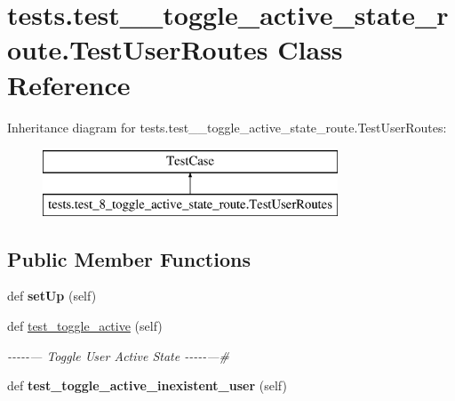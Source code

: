 \hypertarget{classtests_1_1test__8__toggle__active__state__route_1_1_test_user_routes}{}\section{tests.\+test\+\_\+\_\+toggle\+\_\+active\+\_\+state\+\_\+route.\+Test\+User\+Routes Class Reference}
\label{classtests_1_1test__8__toggle__active__state__route_1_1_test_user_routes}
Inheritance diagram for tests.\+test\+\_\+\_\+toggle\+\_\+active\+\_\+state\+\_\+route.\+Test\+User\+Routes\+:\begin{figure}[H]
\begin{center}
\leavevmode
\includegraphics[height=2.000000cm]{classtests_1_1test__8__toggle__active__state__route_1_1_test_user_routes}
\end{center}
\end{figure}
\subsection*{Public Member Functions}
\begin{DoxyCompactItemize}
\item 
\mbox{\label{classtests_1_1test__8__toggle__active__state__route_1_1_test_user_routes_ace5e2927f43fc2c7e516df32d2d1d393}} 
def {\bfseries set\+Up} (self)
\item 
\mbox{\label{classtests_1_1test__8__toggle__active__state__route_1_1_test_user_routes_afdcfbebc23000d71f55895db555adb29}} 
def \hyperlink{classtests_1_1test__8__toggle__active__state__route_1_1_test_user_routes_afdcfbebc23000d71f55895db555adb29}{test\+\_\+toggle\+\_\+active} (self)
\begin{DoxyCompactList}\small\item\em -\/-\/-\/-\/-\/--- Toggle User Active State -\/-\/-\/-\/-\/---\# \end{DoxyCompactList}\item 
\mbox{\label{classtests_1_1test__8__toggle__active__state__route_1_1_test_user_routes_a7d0dd3e2a68d3485e9bd593c836c4d7e}} 
def {\bfseries test\+\_\+toggle\+\_\+active\+\_\+inexistent\+\_\+user} (self)
\end{DoxyCompactItemize}
